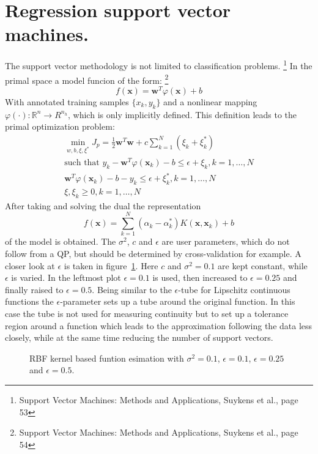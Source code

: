 \section{Regression support vector machines.}
The support vector methodology is not limited to classification problems. \footnote{Support Vector Machines: Methods and Applications, Suykens et al., page 53} In the primal space a model funcion of the form: \footnote{Support Vector Machines: Methods and Applications, Suykens et al., page 54}
\begin{equation}
f(\mathbf{x}) = \mathbf{w}^T \varphi(\mathbf{x}) + b 
\end{equation}
With annotated training samples $\{x_k,y_k\}$ and a nonlinear mapping $\varphi(\cdot) : \mathbb{R}^n \rightarrow R^{n_h}$, which is only implicitly defined. This definition leads to the primal optimization problem:
\begin{align}
\min_{w, b, \xi, \xi^{*}} J_p = \frac{1}{2} \mathbf{w}^T\mathbf{w} + c\sum_{k=1}^{N}(\xi_k + \xi_k^{*}) \\
\text{such that } y_k - \mathbf{w}^T\varphi(\mathbf{x}_k) - b \leq \epsilon  + \xi_k , k = 1,\dots,N \\ 
\mathbf{w}^T\varphi(\mathbf{x}_k) - b - y_k \leq \epsilon  + \xi_k^{*} , k = 1,\dots,N \\
\xi, \xi_k \geq 0 , k = 1,\dots,N
\end{align}
After taking and solving the dual the representation
\begin{equation}
f(\mathbf{x}) = \sum\limits_{k=1}^{N} (\alpha_k - \alpha_k^{*})K(\mathbf{x},\mathbf{x}_k) + b
\end{equation}
of the model is obtained. The $\sigma^2$, $c$ and $\epsilon$ are user parameters, which do not follow from a QP, but should be determined by cross-validation for example. A closer look at $\epsilon$ is taken in figure~\ref{fig:ebfEstEps}. Here $c$ and $\sigma^2 = 0.1$ are kept constant, while $\epsilon$ is varied. In the leftmost plot $\epsilon = 0.1$ is used, then increased to $\epsilon = 0.25$ and finally raised to $\epsilon = 0.5$. Being similar to the $\epsilon$-tube for Lipschitz continuous functions the $\epsilon$-parameter sets up a tube around the original function. In this case the tube is not used for measuring continuity but to set up a tolerance region around a function which leads to the approximation following the data less closely, while at the same time reducing the number of support vectors. 
\begin{figure}
\centering



\caption{RBF kernel based funtion esimation with $\sigma^2 = 0.1$, $\epsilon = 0.1$, $\epsilon = 0.25$ and $\epsilon = 0.5$.}
\label{fig:ebfEstEps}
\end{figure}
